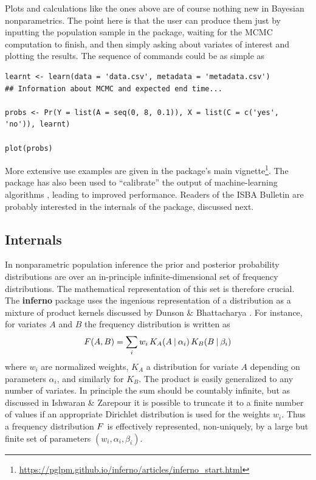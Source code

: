Plots and calculations like the ones above are of course nothing new in Bayesian nonparametrics. The point here is that the user can produce them just by inputting the population sample in the package, waiting for the MCMC computation to finish, and then simply asking about variates of interest and plotting the results. The sequence of commands could be as simple as
\begin{verbatim}
learnt <- learn(data = 'data.csv', metadata = 'metadata.csv')
## Information about MCMC and expected end time...

probs <- Pr(Y = list(A = seq(0, 8, 0.1)), X = list(C = c('yes', 'no')), learnt)

plot(probs)
\end{verbatim}
More extensive use examples are given in the package's main vignette\footnote{\url{https://pglpm.github.io/inferno/articles/inferno_start.html}}. The package has also been used to ``calibrate'' the output of machine-learning algorithms \citep{dyrlandetal2022b}, leading to improved performance. Readers of the ISBA Bulletin are probably interested in the internals of the package, discussed next.


\subsection*{Internals}
\label{sec:representation}

In nonparametric population inference the prior and posterior probability distributions are over an in-principle infinite-dimensional set of frequency distributions. The mathematical representation of this set is therefore crucial. The \textbf{inferno} package uses the ingenious representation of a distribution as a mixture of product kernels discussed by Dunson \& Bhattacharya \citeyear{dunsonetal2011}. For instance, for variates $A$ and $B$ the frequency distribution is written as
\begin{equation}
  \label{eq:mixture_kernel}
  \yF(A, B) = \sum_{i} w_{i}\, K_{A}(A \| \alpha_{i})\, K_{B}(B \| \beta_{i})
\end{equation}
where $w_{i}$ are normalized weights, $K_{A}$ a distribution for variate $A$ depending on parameters $\alpha_{i}$, and similarly for $K_{B}$. The product is easily generalized to any number of variates. In principle the sum should be countably infinite, but as discussed in Ishwaran \& Zarepour \citeyear{ishwaranetal2002c} it is possible to truncate it to a finite number of values if an appropriate Dirichlet distribution is used for the weights $w_{i}$. Thus a frequency distribution $F$ is effectively represented, non-uniquely, by a large but finite set of parameters $(w_{i}, \alpha_{i}, \beta_{i})$.

